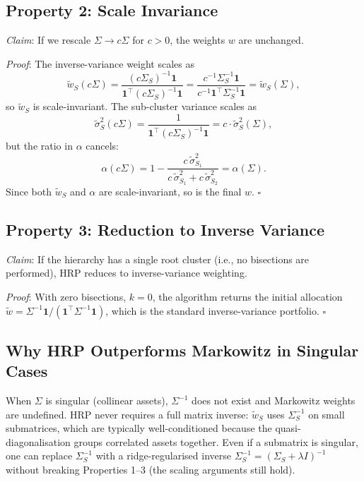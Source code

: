 \subsection{Property 2: Scale Invariance}

\emph{Claim}: If we rescale $\Sigma \to c \Sigma$ for $c > 0$, the
weights $w$ are unchanged.

\emph{Proof}: The inverse-variance weight scales as
\[
\tilde{w}_S(c \Sigma) = \frac{(c \Sigma_S)^{-1} \mathbf{1}}{\mathbf{1}^\top (c \Sigma_S)^{-1} \mathbf{1}} = \frac{c^{-1} \Sigma_S^{-1} \mathbf{1}}{c^{-1} \mathbf{1}^\top \Sigma_S^{-1} \mathbf{1}} = \tilde{w}_S(\Sigma),
\]
so $\tilde{w}_S$ is scale-invariant. The sub-cluster variance scales as
\[
\tilde{\sigma}_S^2(c \Sigma) = \frac{1}{\mathbf{1}^\top (c \Sigma_S)^{-1} \mathbf{1}} = c \cdot \tilde{\sigma}_S^2(\Sigma),
\]
but the ratio in $\alpha$ cancels:
\[
\alpha(c \Sigma) = 1 - \frac{c \, \tilde{\sigma}_{S_1}^2}{c \, \tilde{\sigma}_{S_1}^2 + c \, \tilde{\sigma}_{S_2}^2} = \alpha(\Sigma).
\]
Since both $\tilde{w}_S$ and $\alpha$ are scale-invariant, so is the
final $w$. $\square$


\subsection{Property 3: Reduction to Inverse Variance}

\emph{Claim}: If the hierarchy has a single root cluster (i.e., no
bisections are performed), HRP reduces to inverse-variance weighting.

\emph{Proof}: With zero bisections, $k = 0$, the algorithm returns
the initial allocation $\tilde{w} = \Sigma^{-1} \mathbf{1} / (\mathbf{1}^\top
\Sigma^{-1} \mathbf{1})$, which is the standard inverse-variance
portfolio. $\square$

\subsection{Why HRP Outperforms Markowitz in Singular Cases}

When $\Sigma$ is singular (collinear assets), $\Sigma^{-1}$ does not
exist and Markowitz weights are undefined. HRP never requires a full
matrix inverse: $\tilde{w}_S$ uses $\Sigma_S^{-1}$ on small submatrices,
which are typically well-conditioned because the quasi-diagonalisation
groups correlated assets together. Even if a submatrix is singular,
one can replace $\Sigma_S^{-1}$ with a ridge-regularised inverse
$\Sigma_S^{-1} = (\Sigma_S + \lambda I)^{-1}$ without breaking
Properties 1--3 (the scaling arguments still hold).

